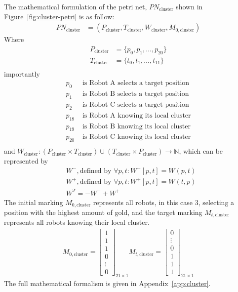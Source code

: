 \documentclass[12pt,a4paper]{article}
\begin{document}
The mathematical formulation of the petri net, $PN_{\text{cluster}}$ shown in Figure~\ref{fig:cluster-petri} is as follow:
\begin{align*}
    PN_{\text{cluster}} &= (P_{\text{cluster}}, T_{\text{cluster}}, W_{\text{cluster}}, M_{0, \text{cluster}})
\end{align*}
Where
\begin{align*}
    P_{\text{cluster}} &= \{p_0, p_1, \ldots, p_{20}\} \\
    T_{\text{cluster}} &= \{t_0, t_1, \ldots, t_{11}\} \\
\end{align*}
importantly
\begin{align*}
    p_0 &\text{ is Robot A selects a target position} \\
    p_1 &\text{ is Robot B selects a target position} \\
    p_2 &\text{ is Robot C selects a target position} \\
    p_{18} &\text{ is Robot A knowing its local cluster} \\
    p_{19} &\text{ is Robot B knowing its local cluster} \\
    p_{20} &\text{ is Robot C knowing its local cluster} \\
\end{align*}
and ${\displaystyle W_{\text{cluster}}:(P_{\text{cluster}}\times T_{\text{cluster}})\cup (T_{\text{cluster}}\times P_{\text{cluster}})\to \mathbb {N} }$, which can be represented by
\begin{align*}
    &W^{-}, \text{defined by } \forall p,t : W^{-}[p,t] = W(p, t) \\
    &W^{+}, \text{defined by } \forall p,t : W^{+}[p,t] = W(t, p) \\
    &W^{T} = -W^{-} + W^{+}
\end{align*}
The initial marking $M_{0, \text{cluster}}$ represents all robots, in this case 3, selecting a position with the highest amount of gold, and the target marking $M_{t, \text{cluster}}$ represents all robots knowing their local cluster.
\begin{align*}
    M_{0, \text{cluster}} = \begin{bmatrix}
        1 \\ 1 \\ 1 \\ 0 \\ \vdots \\ 0
    \end{bmatrix}_{21 \times 1}
    M_{t, \text{cluster}} = \begin{bmatrix}
        0 \\ \vdots \\ 0 \\ 1 \\ 1 \\ 1
    \end{bmatrix}_{21 \times 1}
\end{align*}
The full mathematical formalism is given in Appendix~\ref{app:cluster}.
\end{document}
